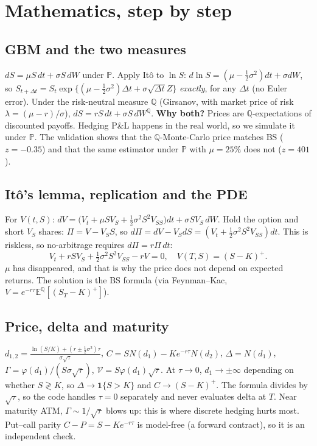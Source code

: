 \documentclass[10.5pt,a4paper]{article}
\begin{document}
\section{Mathematics, step by step}
\subsection{GBM and the two measures}
$dS=\mu S\,dt+\sigma S\,dW$ under $\mathbb P$. Apply It\^o to $\ln S$: $d\ln S=(\mu-\tfrac12\sigma^2)dt+\sigma dW$, so
$S_{t+\Delta t}=S_t\exp\{(\mu-\tfrac12\sigma^2)\Delta t+\sigma\sqrt{\Delta t}Z\}$ \emph{exactly}, for any $\Delta t$ (no Euler error).
Under the risk-neutral measure $\mathbb Q$ (Girsanov, with market price of risk $\lambda=(\mu-r)/\sigma$), $dS=rS\,dt+\sigma S\,dW^{\mathbb Q}$. \textbf{Why both?}
Prices are $\mathbb Q$-expectations of discounted payoffs. Hedging P\&L happens in the real world, so we simulate it under $\mathbb P$.
The validation shows that the $\mathbb Q$-Monte-Carlo price matches BS ($z=-0.35$) and that the same estimator under $\mathbb P$ with $\mu=25\%$ does not ($z=401$).

\subsection{It\^o's lemma, replication and the PDE}
For $V(t,S)$: $dV=\big(V_t+\mu SV_S+\tfrac12\sigma^2S^2V_{SS}\big)dt+\sigma SV_S\,dW$.
Hold the option and short $V_S$ shares: $\Pi=V-V_SS$, so $d\Pi=dV-V_SdS=(V_t+\tfrac12\sigma^2S^2V_{SS})dt$. This is riskless, so no-arbitrage requires $d\Pi=r\Pi\,dt$:
\[V_t+rSV_S+\tfrac12\sigma^2S^2V_{SS}-rV=0,\quad V(T,S)=(S-K)^+.\]
$\mu$ has disappeared, and that is why the price does not depend on expected returns. The solution is the BS formula (via Feynman--Kac, $V=e^{-r\tau}\mathbb E^{\mathbb Q}[(S_T-K)^+]$).

\subsection{Price, delta and maturity}
$d_{1,2}=\frac{\ln(S/K)+(r\pm\frac12\sigma^2)\tau}{\sigma\sqrt\tau}$, $C=SN(d_1)-Ke^{-r\tau}N(d_2)$, $\Delta=N(d_1)$, $\Gamma=\varphi(d_1)/(S\sigma\sqrt\tau)$, $\mathcal V=S\varphi(d_1)\sqrt\tau$.
At $\tau\to0$, $d_1\to\pm\infty$ depending on whether $S\gtrless K$, so $\Delta\to\mathbf 1\{S>K\}$ and $C\to(S-K)^+$. The formula divides by $\sqrt\tau$, so the code handles $\tau=0$
separately and never evaluates delta at $T$. Near maturity ATM, $\Gamma\sim1/\sqrt\tau$ blows up: this is where discrete hedging hurts most.
Put--call parity $C-P=S-Ke^{-r\tau}$ is model-free (a forward contract), so it is an independent check.
\end{document}
